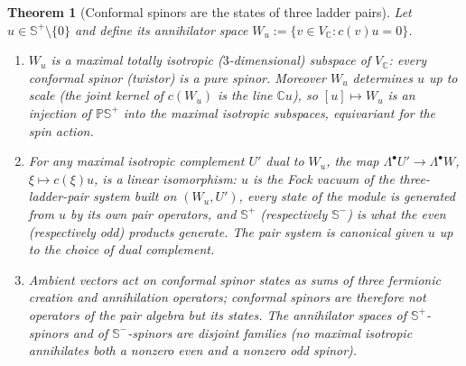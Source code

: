 \documentclass[11pt]{article}
\newtheorem{theorem}{Theorem}[section]
\theoremstyle{definition}
\theoremstyle{plain}
\newcommand{\changedmark}[2]{\marginpar{\raggedright\scriptsize\color{#1}#2}}
\providecommand{\C}{}\renewcommand{\C}{\mathbb{C}}
\providecommand{\CS}{}\renewcommand{\CS}{{\mathbb{S}^{+}}}
\providecommand{\CSm}{}\renewcommand{\CSm}{{\mathbb{S}^{-}}}
\providecommand{\PCS}{}\renewcommand{\PCS}{\mathbb{P}{\mathbb{S}^{+}}}
\begin{document}
\begin{theorem}[Conformal spinors are the states of three ladder pairs]\label{c:correspondence.twistors-are-states-three-ladder-pairs}
\changedmark{gray}{reworded}
Let $u \in \CS\setminus\{0\}$ and define its \emph{annihilator space} $W_u := \{v \in V_\C : c(v)u = 0\}$.
\begin{enumerate}
\item $W_u$ is a maximal totally isotropic ($3$-dimensional) subspace of $V_\C$: \emph{every} conformal spinor (twistor) is a pure spinor. Moreover $W_u$ determines $u$ up to scale (the joint kernel of $c(W_u)$ is the line $\C u$), so $[u] \mapsto W_u$ is an injection of $\PCS$ into the maximal isotropic subspaces, equivariant for the spin action.
\item For any maximal isotropic complement $U'$ dual to $W_u$, the map $\Lambda^\bullet U' \to \Lambda^\bullet W$, $\xi \mapsto c(\xi)u$, is a linear isomorphism: $u$ is the Fock vacuum of the three-ladder-pair system built on $(W_u, U')$, every state of the module is generated from $u$ by its own pair operators, and $\CS$ (respectively $\CSm$) is what the even (respectively odd) products generate. The pair system is canonical given $u$ up to the choice of dual complement.
\item Ambient vectors act on conformal spinor states as sums of three fermionic creation and annihilation operators; conformal spinors are therefore not \emph{operators} of the pair algebra but its \emph{states}. The annihilator spaces of $\CS$-spinors and of $\CSm$-spinors are disjoint families (no maximal isotropic annihilates both a nonzero even and a nonzero odd spinor).
\end{enumerate}
\end{theorem}
\end{document}
